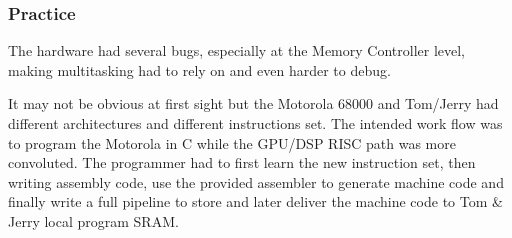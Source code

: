 \subsubsection{Practice}
The hardware had several bugs, especially at the Memory Controller level, making multitasking had to rely on and even harder to debug.\\
\par
It may not be obvious at first sight but the Motorola 68000 and Tom/Jerry had different architectures and different instructions set. The intended work flow was to program the Motorola in C while the GPU/DSP RISC path was more convoluted. The programmer had to first learn the new instruction set, then writing assembly code, use the provided assembler to generate machine code and finally write a full pipeline to store and later deliver the machine code to Tom \& Jerry local program SRAM.\\
\par











